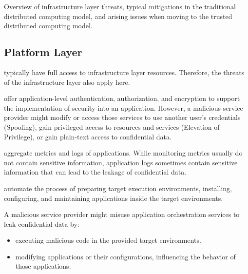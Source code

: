 \begin{table}[H]
  \centering
  \scriptsize
  
  \caption[Overview of infrastructure layer threats.]{ Overview of infrastructure
    layer threats, typical mitigations in the traditional distributed computing
    model, and arising issues when moving to the trusted distributed computing
    model. }
  \label{table:threats-overview}
\end{table}

\subsection{Platform Layer}

\begin{description}[style=standard]
  \item[Infrastructure management services] typically have full access to
    infrastructure layer resources. Therefore, the threats of the infrastructure
    layer also apply here.

  \item[Security services] offer application-level authentication,
    authorization, and encryption to support the implementation of security into
    an application. However, a malicious service provider might modify or access
    those services to use another user's credentials (Spoofing), gain privileged
    access to resources and services (Elevation of Privilege), or gain
    plain-text access to confidential data.

  \item[Monitoring and logging services] aggregate metrics and logs of
    applications. While monitoring metrics usually do not contain sensitive
    information, application logs sometimes contain sensitive information that
    can lead to the leakage of confidential data.

  \item[Application orchestration services] automate the process of preparing
    target execution environments, installing, configuring, and maintaining
    applications inside the target environments.

    A malicious service provider might misuse application orchestration services
    to leak confidential data by:

    \begin{itemize}
      \item executing malicious code in the provided target environments.
      \item modifying applications or their configurations, influencing the
            behavior of those applications.
    \end{itemize}
\end{description}

